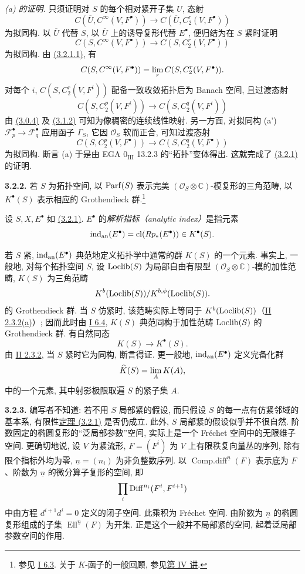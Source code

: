 \emph{(a) 的证明.} 只须证明对 $S$ 的每个相对紧开子集 $U$, 态射
\[
 C(\overline U,C^\infty(V,F^\bullet))\longrightarrow C(\overline U,C_2^{r}(V,F^\bullet))
\]
为拟同构. 以 $\overline U$ 代替 $S$, 以 $\overline U$ 上的诱导复形代替 $E^\bullet$, 便归结为在 $S$ 紧时证明
\[
 C(S,C^\infty(V,F^\bullet))\longrightarrow C(S,C_2^{r}(V,F^\bullet))
\]
为拟同构. 由 \hyperlink{sga6.e02.eq.3-2-1-1}{(3.2.1.1)}, 有
\[
 C(S,C^\infty(V,F^\bullet))=\operatorname*{lim}_r C(S,C_2^r(V,F^\bullet)).
\]
对每个 $i$, $C(S,C_2^r(V,F^i))$ 配备一致收敛拓扑后为 Banach 空间, 且过渡态射
\[
 C(S,C_2^p(V,F^i))\longrightarrow C(S,C_2^q(V,F^i))
\]
由 \hyperlink{sga6.e02.para.3-0-4}{(3.0.4)} 及 \hyperlink{sga6.e02.lem.3-1-2}{(3.1.2)} 可知为像稠密的连续线性映射. 另一方面, 对拟同构 (a') $\mathcal F_p^\bullet\to\mathcal F_q^\bullet$ 应用函子 $\Gamma_S$, 它因 $\mathcal O_S$ 软而正合, 可知过渡态射
\[
C(S,C_2^p(V,F^\bullet))\longrightarrow C(S,C_2^q(V,F^\bullet))
\]
为拟同构. 断言 (a) 于是由 EGA $0_{\mathrm{III}}$ 13.2.3 的“拓扑”变体得出. 这就完成了 \hyperlink{sga6.e02.thm.3-2-1}{(3.2.1)} 的证明.

\textbf{3.2.2.} 若 $S$ 为拓扑空间, 以 $\operatorname{Parf}(S)$ 表示完美 $(\mathcal O_S\otimes\mathbb C)$-模复形的三角范畴, 以 $K^{\bullet}(S)$ 表示相应的 Grothendieck 群.\footnote{参见 \hyperlink{sga6.e01.para.6-3}{I 6.3}. 关于 $K$-函子的一般回顾, 参见\hyperlink{sga6.e04.expose}{第 IV 讲}.}

设 $S,X,E^\bullet$ 如 \hyperlink{sga6.e02.thm.3-2-1}{(3.2.1)}. $E^\bullet$ 的\emph{解析指标（analytic index）}是指元素
\[
 \operatorname{ind}_{\mathrm{an}}(E^\bullet)=\operatorname{cl}(Rp_*(E^\bullet))\in K^{\bullet}(S).
\]

若 $S$ 紧, $\operatorname{ind}_{\mathrm{an}}(E^\bullet)$ 典范地定义拓扑学中通常的群 $K(S)$ 的一个元素. 事实上, 一般地, 对每个拓扑空间 $S$, 设 $\operatorname{Loclib}(S)$ 为局部自由有限型 $(\mathcal O_S\otimes\mathbb C)$-模的加性范畴, $K(S)$ 为三角范畴
\[
 K^b(\operatorname{Loclib}(S))/K^{b,\phi}(\operatorname{Loclib}(S)).
\]
的 Grothendieck 群. 当 $S$ 仿紧时, 该范畴实际上等同于 $K^b(\operatorname{Loclib}(S))$（\hyperlink{sga6.e02.prop.2-3-2}{II 2.3.2(a)}）; 因而此时由 \hyperlink{sga6.e01.lem.6-4}{I 6.4}, $K(S)$ 典范同构于加性范畴 $\operatorname{Loclib}(S)$ 的 Grothendieck 群. 有自然同态
\[
 K(S)\longrightarrow K^{\bullet}(S).
\]
由 \hyperlink{sga6.e02.prop.2-3-2}{II 2.3.2}, 当 $S$ 紧时它为同构, 断言得证. 更一般地, $\operatorname{ind}_{\mathrm{an}}(E^\bullet)$ 定义完备化群
\[
 \widehat K(S)=\operatorname*{lim}_A K(A),
\]
中的一个元素, 其中射影极限取遍 $S$ 的紧子集 $A$.

\textbf{3.2.3.} 编写者不知道: 若不用 $S$ 局部紧的假设, 而只假设 $S$ 的每一点有仿紧邻域的基本系, 有限性\hyperlink{sga6.e02.thm.3-2-1}{定理 (3.2.1)} 是否仍成立. 此外, $S$ 局部紧的假设似乎并不很自然. 阶数固定的椭圆复形的“泛局部参数”空间, 实际上是一个 Fréchet 空间中的无限维子空间. 更确切地说, 设 $V$ 为紧流形, $F=(F^i)$ 为 $V$ 上有限秩复向量丛的序列, 除有限个指标外均为零, $\underline n=(n_i)$ 为非负整数序列. 以 $\operatorname{Comp.diff}^{\underline n}(F)$ 表示底为 $F$、阶数为 $\underline n$ 的微分算子复形的空间, 即
\[
 \prod_i \operatorname{Diff}^{n_i}(F^i,F^{i+1})
\]
中由方程 $d^{i+1}d^i=0$ 定义的闭子空间. 此乘积为 Fréchet 空间. 由阶数为 $\underline n$ 的椭圆复形组成的子集 $\operatorname{Ell}^{\underline n}(F)$ 为开集. 正是这个一般并不局部紧的空间, 起着泛局部参数空间的作用.

